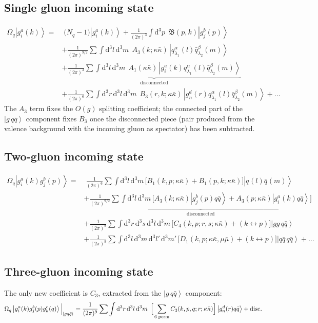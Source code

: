 \documentclass[11pt]{article}
\newcommand{\dd}{\mathrm{d}}
\newcommand{\dt}[1]{\dd^3 #1\,}
\newcommand{\ket}[1]{\left|#1\right\rangle}
\newcommand{\gl}[3]{g^{#1}_{#2}(#3)}
\newcommand{\qk}[3]{q^{#1}_{#2}(#3)}
\newcommand{\aqk}[3]{\bar q^{#1}_{#2}(#3)}
\newcommand{\OM}{\Omega}
\newcommand{\OMq}{\OM_{q}}
\begin{document}
\subsection{Single gluon incoming state}
\begin{align}
\OMq\ket{\gl{a}{i}{k}}=&\;\big(N_q-1\big)\ket{\gl{a}{i}{k}}
+\frac{1}{(2\pi)^3}\int\!\dt{p}\;\mathfrak B(p,k)\ket{\gl{b}{j}{p}}
\nonumber\\
&+\frac{1}{(2\pi)^{9/2}}\sum\int\dt{l}\dt{m}\;A_3(k;\kappa\bar\kappa)\,
\ket{\qk{\alpha}{\lambda_1}{l}\aqk{\beta}{\lambda_2}{m}}
\nonumber\\
&+\underbrace{\frac{1}{(2\pi)^{3}}\sum\int\dt{l}\dt{m}\;A_1(\kappa\bar\kappa)\,
\ket{\gl{a}{i}{k}\qk{\alpha}{\lambda_1}{l}\aqk{\beta}{\lambda_2}{m}}}_{\text{disconnected}}
\nonumber\\
&+\frac{1}{(2\pi)^{6}}\sum\int\dt{r}\dt{l}\dt{m}\;B_3(r,k;\kappa\bar\kappa)\,
\ket{\gl{d}{n}{r}\qk{\alpha}{\lambda_1}{l}\aqk{\beta}{\lambda_2}{m}}+\dots
\label{eq:Omg}
\end{align}
The $A_3$ term fixes the $O(g)$ splitting coefficient; the connected part of the
$\ket{g\,q\bar q}$ component fixes $B_3$ once the disconnected piece (pair produced from the
valence background with the incoming gluon as spectator) has been subtracted.

\subsection{Two-gluon incoming state}
\begin{align}
\OMq\ket{\gl{a}{i}{k}\gl{b}{j}{p}}=&\;
\frac{1}{(2\pi)^{6}}\sum\int\dt{l}\dt{m}\Big[B_1(k,p;\kappa\bar\kappa)+B_1(p,k;\kappa\bar\kappa)\Big]
\ket{\qk{}{}{l}\aqk{}{}{m}}
\nonumber\\
&+\underbrace{\frac{1}{(2\pi)^{9/2}}\sum\int\dt{l}\dt{m}\Big[A_3(k;\kappa\bar\kappa)\ket{\gl{b}{j}{p}q\bar q}
+A_3(p;\kappa\bar\kappa)\ket{\gl{a}{i}{k}q\bar q}\Big]}_{\text{disconnected}}
\nonumber\\
&+\frac{1}{(2\pi)^{9}}\sum\int\dt{r}\dt{s}\dt{l}\dt{m}
\Big[C_4(k,p;r,s;\kappa\bar\kappa)+(k\!\leftrightarrow\! p)\Big]\ket{gg\,q\bar q}
\nonumber\\
&+\frac{1}{(2\pi)^{9}}\sum\int\dt{l}\dt{m}\dt{l'}\dt{m'}
\Big[D_1(k,p;\kappa\bar\kappa,\mu\bar\mu)+(k\!\leftrightarrow\! p)\Big]\ket{q\bar q\,q\bar q}+\dots
\label{eq:Omgg}
\end{align}

\subsection{Three-gluon incoming state}
The only new coefficient is $C_3$, extracted from the $\ket{g\,q\bar q}$ component:
\begin{equation}
\OMq\ket{\gl{a}{i}{k}\gl{b}{j}{p}\gl{c}{k}{q}}\Big|_{\ket{gq\bar q}}=
\frac{1}{(2\pi)^{9}}\sum\int\dt{r}\dt{l}\dt{m}\;
\Big[\sum_{\rm 6\;perm}C_3(k,p,q;r;\kappa\bar\kappa)\Big]\ket{\gl{d}{n}{r}q\bar q}+\text{disc.}
\label{eq:Omggg}
\end{equation}
\end{document}
